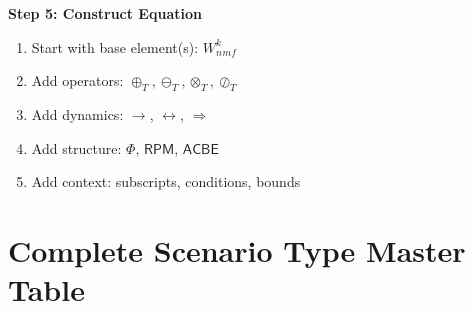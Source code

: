 \documentclass[11pt,twoside]{book}
\newcommand{\Frac}{\Phi}
\newcommand{\RPM}{\mathsf{RPM}}
\newcommand{\ACBE}{\mathsf{ACBE}}
\newcommand{\Tadd}{\oplus_T}
\newcommand{\Tsub}{\ominus_T}
\newcommand{\Tmul}{\otimes_T}
\newcommand{\Tdiv}{\oslash_T}
\begin{document}
\begin{tcolorbox}[colback=blue!5!white,colframe=blue!75!black,title=\textbf{Decision Algorithm},breakable]
\textbf{Step 5: Construct Equation}
\begin{enumerate}
    \item Start with base element(s): $W_n^k_{mf}$
    \item Add operators: $\Tadd, \Tsub, \Tmul, \Tdiv$
    \item Add dynamics: $\to$, $\leftrightarrow$, $\Rightarrow$
    \item Add structure: $\Frac$, $\RPM$, $\ACBE$
    \item Add context: subscripts, conditions, bounds
\end{enumerate}
\end{tcolorbox}

\section{Complete Scenario Type Master Table}
\end{document}

